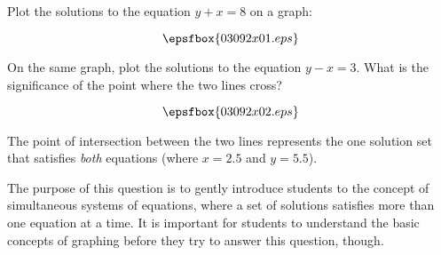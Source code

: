 

Plot the solutions to the equation $y + x = 8$ on a graph:

$$\epsfbox{03092x01.eps}$$

On the same graph, plot the solutions to the equation $y - x = 3$.  What is the significance of the point where the two lines cross?







$$\epsfbox{03092x02.eps}$$

The point of intersection between the two lines represents the one solution set that satisfies {\it both} equations (where $x = 2.5$ and $y = 5.5$).







The purpose of this question is to gently introduce students to the concept of simultaneous systems of equations, where a set of solutions satisfies more than one equation at a time.  It is important for students to understand the basic concepts of graphing before they try to answer this question, though.





